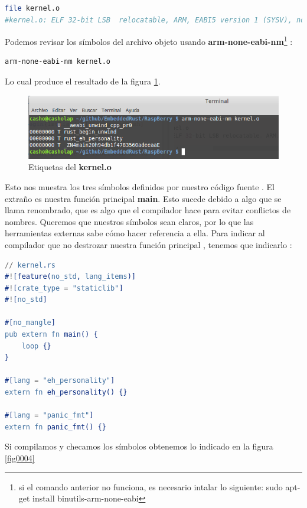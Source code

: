 \documentclass[12pt, twoside]{report}
\begin{document}
\begin{lstlisting}[language=bash]
file kernel.o
#kernel.o: ELF 32-bit LSB  relocatable, ARM, EABI5 version 1 (SYSV), not stripped
\end{lstlisting}

Podemos revisar los símbolos del archivo objeto usando \textbf{arm-none-eabi-nm}\footnote{si el comando anterior no funciona, es necesario intalar lo siguiente: sudo apt-get install binutils-arm-none-eabi} :

\begin{lstlisting}[language=bash]
arm-none-eabi-nm kernel.o
\end{lstlisting}

Lo cual produce el resultado de la figura \ref{fig0003}.

\begin{figure}
	\centering	\includegraphics[width=1\linewidth]{rust_kernel3.png}
	\caption{Etiquetas del \textbf{kernel.o}}
	\label{fig0003}
\end{figure}

Esto nos muestra los tres símbolos definidos por nuestro código fuente . El extraño es nuestra función principal \textbf{main}. Esto sucede debido a algo que se llama renombrado, que es algo que el compilador hace para evitar conflictos de nombres. Queremos que nuestros símbolos sean claros, por lo que las herramientas externas sabe cómo hacer referencia a ella. Para indicar al compilador que no destrozar nuestra función principal , tenemos que indicarlo :

\begin{lstlisting}[language=erlang]
// kernel.rs
#![feature(no_std, lang_items)]
#![crate_type = "staticlib"]
#![no_std]

#[no_mangle]
pub extern fn main() {  
    loop {}
}

#[lang = "eh_personality"]
extern fn eh_personality() {}

#[lang = "panic_fmt"]
extern fn panic_fmt() {}  
\end{lstlisting}

Si compilamos y checamos los símbolos obtenemos lo indicado en la figura \ref{fig0004}
\end{document}
